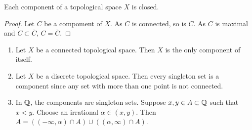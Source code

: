 \begin{proposition}[]
	Each component of a topological space $X$ is closed.
\end{proposition}

\begin{proof}
	Let $C$ be a compoment of $X$.
	As $C$ is connected, so is $\overline C$.
	As $C$ is maximal and $C \subset \overline C$,
	$C = \overline C$.
\end{proof}

\begin{examples}
	\begin{enumerate}
		\item
		Let $X$ be a connected topological space.
		Then $X$ is the only component of itself.

		\item
		Let $X$ be a discrete topological space.
		Then every singleton set is a component since any set with more than one
		point is not connected.

		\item
		In $\mathbb{Q}$, the components are singleton sets.
		Suppose $x, y \in A \subset \mathbb{Q}$ such that $x < y$.
		Choose an irrational $\alpha \in (x,y)$.
		Then 
		$
			A = \left( 
				(-\infty, \alpha) \cap A 
			\right) \cup \left( 
				(\alpha, \infty) \cap A %
			\right)
		$.
	\end{enumerate}
\end{examples}

